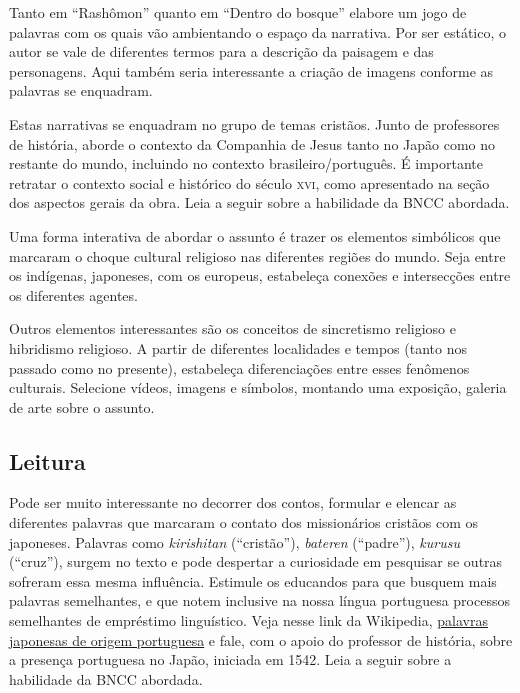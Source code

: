 \documentclass[12pt]{extarticle}
\begin{document}
Tanto em ``Rashômon'' quanto em ``Dentro do bosque'' elabore um jogo de palavras com os
quais vão ambientando o espaço da narrativa. Por ser estático, o autor se vale
de diferentes termos para a descrição da paisagem e das personagens. Aqui
também seria interessante a criação de imagens conforme as palavras se
enquadram.

Estas narrativas se enquadram no grupo de temas cristãos. Junto de professores
de história, aborde o
contexto da Companhia de Jesus tanto no Japão como no restante do mundo,
incluindo no contexto brasileiro/português. É importante retratar o contexto
social e histórico do século \textsc{xvi}, como apresentado na seção dos
aspectos gerais da obra.
Leia a seguir sobre a habilidade da BNCC abordada.

Uma forma interativa de abordar o assunto é trazer os elementos simbólicos que
marcaram o choque cultural religioso nas diferentes regiões do mundo. Seja
entre os indígenas, japoneses, com os europeus, estabeleça conexões e
intersecções entre os diferentes agentes.

Outros elementos interessantes são os conceitos de sincretismo religioso e
hibridismo religioso. A partir de diferentes localidades e tempos (tanto nos
passado como no presente), estabeleça diferenciações entre esses fenômenos
culturais. Selecione vídeos, imagens e símbolos, montando uma exposição,
galeria de arte sobre o assunto.

\subsection{Leitura}

Pode ser muito interessante no decorrer dos contos, formular e elencar as diferentes
palavras que marcaram o contato dos missionários cristãos com os japoneses.
Palavras como \textit{kirishitan} (``cristão''), \textit{bateren} (``padre''), 
\textit{kurusu} (``cruz''),
surgem no texto e pode despertar a curiosidade em pesquisar se outras sofreram
essa mesma influência.  Estimule os educandos para que busquem mais palavras semelhantes, 
e que notem inclusive na nossa língua portuguesa processos semelhantes de empréstimo
linguístico. Veja nesse link da Wikipedia, \href{https://pt.wikipedia.org/wiki/Palavras_japonesas_de_origem_portuguesa}{palavras japonesas de origem 
portuguesa} e fale, com o apoio do professor de história, sobre a presença portuguesa no Japão, iniciada
em 1542.
Leia a seguir sobre a habilidade da BNCC abordada.
\end{document}
